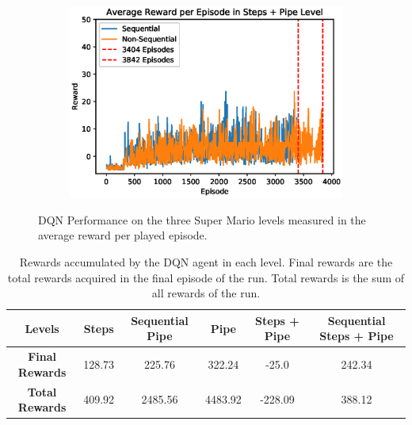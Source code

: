 \documentclass[notitlepage,a4paper,11pt]{article}
\begin{document}
\begin{figure}[t]
\begin{subfigure}[t]{0.32\textwidth}
         \includegraphics[width=\textwidth]{figs/dqn_results_3.eps}
         \caption{}
         \label{fig:dqn_results_3}
     \end{subfigure}
        \caption{DQN Performance on the three Super Mario levels measured in the average reward per played episode.}
        \label{fig:dqn_results}
\end{figure}

\begin{table}[h!]
\centering
\begin{tabular}{ |c|c|c|c|c|c| } 
	\hline
	\textbf{Levels} & Steps & Sequential Pipe & Pipe & Steps + Pipe & Sequential Steps + Pipe\\
	\hline
	\textbf{Final Rewards} & 128.73 & 225.76 & 322.24 & -25.0 & 242.34 \\
	\hline
	\textbf{Total Rewards} & 409.92 & 2485.56 & 4483.92 & -228.09 & 388.12 \\
	\hline
\end{tabular}
\caption{Rewards accumulated by the DQN agent in each level. Final rewards are the total rewards acquired in the final episode of the run. Total rewards is the sum of all rewards of the run.}
\end{table}
\end{document}
